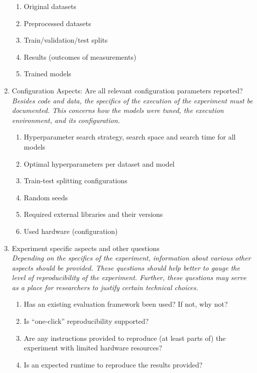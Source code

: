 \begin{enumerate}
\begin{enumerate}[label*=\arabic*.]
        \item Original datasets
        \item Preprocessed datasets
        \item Train/validation/test splits
        \item Results (outcomes of measurements)
        \item Trained models
    \end{enumerate}
\item Configuration Aspects: Are all relevant configuration parameters reported? \\ 
\emph{Besides code and data, the specifics of the execution of the experiment must be documented. This concerns how the models were tuned, the execution environment, and its configuration.}
    \begin{enumerate}[label*=\arabic*.]
        \item Hyperparameter search strategy, search space and search time for all models
        \item Optimal hyperparameters per dataset and model
        \item Train-test splitting configurations
        \item Random seeds
        \item Required external libraries and their versions
        \item Used hardware (configuration)
    \end{enumerate}
\item Experiment specific aspects and other questions \\ 
\emph{Depending on the specifics of the experiment, information about various other aspects should be provided. These questions should help better to gauge the level of reproducibility of the experiment. Further, these questions may serve as a place for researchers to justify certain technical choices. }
    \begin{enumerate}[label*=\arabic*.]
        \item Has an existing evaluation framework been used? If not, why not?
        \item Is ``one-click'' reproducibility supported?
        \item Are any instructions provided to reproduce (at least parts of) the experiment with limited hardware resources?
        \item Is an expected runtime to reproduce the results provided?
    \end{enumerate}
\end{enumerate}

